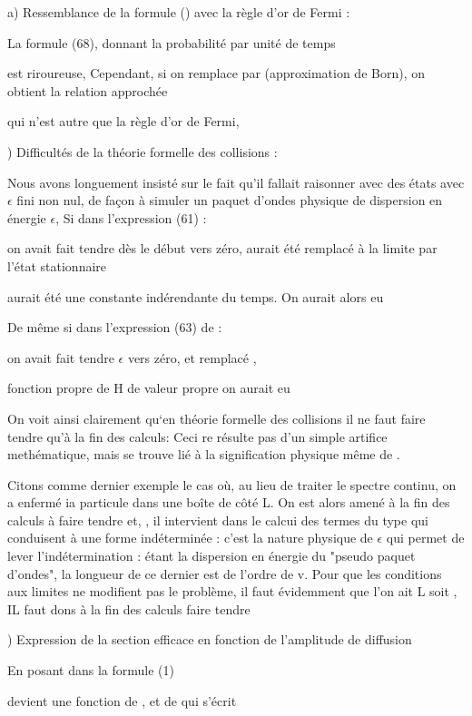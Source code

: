 a) Ressemblance de la formule () avec la règle d'or de Fermi :

La formule (68), donnant la probabilité par unité de temps 

est riroureuse, Cependant, si on remplace  par 
(approximation de Born), on obtient la relation approchée

qui n'est autre que la règle d'or de Fermi,

) Difficultés de la théorie formelle des collisions :

Nous avons longuement insisté sur le fait qu'il fallait raisonner
avec des états  avec $\epsilon$ fini non nul, de façon à simuler un paquet
d'ondes physique de dispersion en énergie $\epsilon$, Si dans l'expression (61) :

on avait fait tendre dès le début  vers zéro, aurait été remplacé à la limite par
l'état stationnaire 

aurait été une constante indérendante du temps. On aurait alors eu 


De même si dans l'expression (63) de  :

on avait fait tendre $\epsilon$ vers zéro, et remplacé ,

fonction propre de H de valeur propre on aurait eu

On voit ainsi clairement qu‘en théorie formelle des collisions
il ne faut faire tendre  qu'à la fin des calculs: Ceci re résulte
pas d'un simple artifice methématique, mais se trouve lié à la signification
physique même de .

Citons comme dernier exemple le cas où, au lieu de traiter le
spectre continu, on a enfermé ia particule dans une boîte de côté L. On
est alors amené à la fin des calculs à faire tendre  et, , il
intervient dans le calcui des termes du type  qui conduisent à une forme
indéterminée : c'est la nature physique de $\epsilon$ qui permet de lever l'indétermination : 
étant la dispersion en énergie du "pseudo paquet d'ondes", la
longueur de ce dernier est de l'ordre de v. Pour que les conditions aux
limites ne modifient pas le problème, il faut évidemment que l'on ait L 
soit , IL faut dons à la fin des calculs faire tendre

) Expression de la section efficace en fonction de l'amplitude  de diffusion

En posant dans la formule (1)

 

devient une fonction de , et de  qui s'écrit

